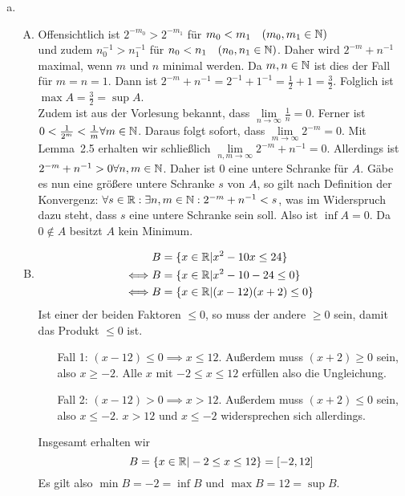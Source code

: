 \documentclass{article}
\begin{document}
	\begin{enumerate}[(a)]
		\item 
		\begin{enumerate}[A)]
			\item Offensichtlich ist $2^{-m_0} > 2^{-m_1}$ für $m_0 < m_1\quad (m_0, m_1 \in \mathbb{N})$ \\und zudem $n_0^{-1} > n_1^{-1}$ für $n_0 < n_1\quad (n_0, n_1 \in \mathbb{N})$.
			Daher wird $2^{-m} + n^{-1}$ maximal, wenn $m$ und $n$ minimal werden. Da $m, n \in \mathbb{N}$ ist dies der Fall für $m = n = 1$. Dann ist $2^{-m} + n^{-1} = 2^{-1} + 1^{-1} = \frac{1}{2} + 1 = \frac{3}{2}$. Folglich ist $\max A = \frac{3}{2} = \sup A$.\\
			Zudem ist aus der Vorlesung bekannt, dass $\lim\limits_{n \to \infty}\frac{1}{n} = 0$.
			Ferner ist $0 < \frac{1}{2^m} < \frac{1}{m} \forall m\in \mathbb{N}$. Daraus folgt sofort, dass $\lim\limits_{m \to \infty} 2^{-m} = 0$.
			Mit Lemma~2.5 erhalten wir schließlich $\lim\limits_{n, m \to \infty} 2^{-m} + n^{-1} = 0$. Allerdings ist $2^{-m} + n^{-1} > 0\forall n, m\in \mathbb{N}$. Daher ist $0$ eine untere Schranke für $A$. Gäbe es nun eine größere untere Schranke $s$ von $A$, so gilt nach Definition der Konvergenz: $\forall s\in \mathbb{R}: \exists n, m \in \mathbb{N}: 2^{-m} + n^{-1}< s$, was im Widerspruch dazu steht, dass $s$ eine untere Schranke sein soll. Also ist $\inf A = 0$. Da $0\notin A$ besitzt $A$ kein Minimum.
			\item 
			\begin{align*}
				B &= \{x\in \mathbb{R}| x^2 -10 x\leq 24\}\\
				\Longleftrightarrow B&= \{x\in \mathbb{R}| x^2 -10 -24 \leq 0\}\\
				\Longleftrightarrow B&= \{x\in \mathbb{R}| (x-12)(x+2) \leq 0\}
			\end{align*}
			Ist einer der beiden Faktoren $\leq 0$, so muss der andere $\geq 0$ sein, damit das Produkt $\leq 0$ ist.
			\begin{itemize}
				\item[Fall 1:] $(x-12) \leq 0 \implies x \leq 12$. Außerdem muss $(x+2) \geq 0$ sein, also $x \geq -2$.
				Alle $x$ mit $-2 \leq x\leq 12$ erfüllen also die Ungleichung.
				\item[Fall 2:] $(x-12) > 0 \implies x > 12$. Außerdem muss $(x+2) \leq 0$ sein, also $x \leq -2$. $x>12$ und $x\leq -2$ widersprechen sich allerdings. 
			\end{itemize}
			Insgesamt erhalten wir
			\[B = \{x\in \mathbb{R}| -2\leq x\leq 12\} = [-2, 12]\]
			Es gilt also $\min B = -2 = \inf B$ und $\max B = 12 = \sup B$.
		\end{enumerate}

\end{enumerate}
\end{document}
